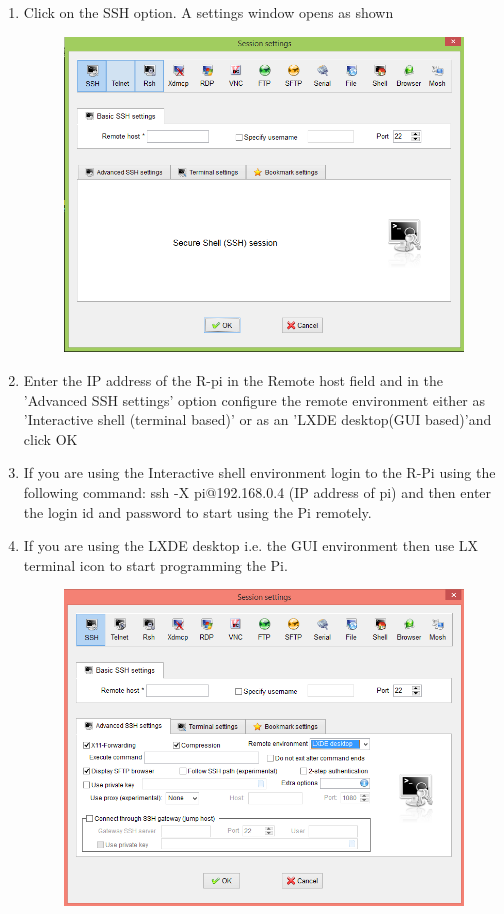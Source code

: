 \documentclass[11pt,a4paper]{report}
\begin{document}
\begin{flushleft}
\begin{enumerate}
\begin{figure}[h!]
			\centering
			\caption{}
		\end{figure}
		\newpage
		\item Click on the SSH option. A settings window opens as shown
		\begin{figure}[h!]
			\includegraphics[scale=0.5]{M3.PNG}
			\centering
			\caption{}
		\end{figure}
		\item Enter the IP address of the R-pi in the Remote host field and in the 'Advanced SSH settings' option configure the remote environment either as 'Interactive shell (terminal based)' or as an 'LXDE desktop(GUI based)'and click OK
		\item If you are using the Interactive shell environment login to the R-Pi using the following command: ssh -X pi@192.168.0.4 (IP address of pi) and then enter the login id and password to start using the Pi remotely.
		\item If you are using the LXDE desktop i.e. the GUI environment then use LX terminal icon to start programming the Pi.
		\begin{figure}[h]
			\includegraphics[scale=0.5]{M4.PNG}

\end{figure}
\end{enumerate}
\end{flushleft}
\end{document}
